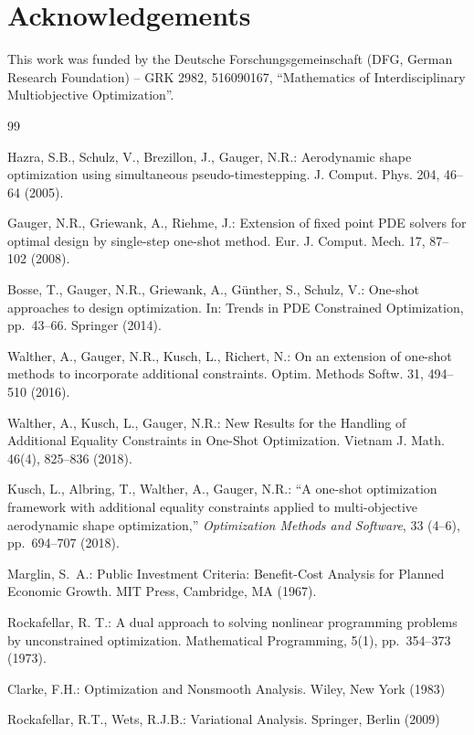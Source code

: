 \documentclass[11pt]{article}
\begin{document}

\section*{Acknowledgements}
This work was funded by the Deutsche Forschungsgemeinschaft (DFG, German Research Foundation)
– GRK 2982, 516090167, ``Mathematics of Interdisciplinary Multiobjective Optimization''.

\begin{thebibliography}{99}

Hazra, S.B., Schulz, V., Brezillon, J., Gauger, N.R.:
Aerodynamic shape optimization using simultaneous pseudo-timestepping.
J. Comput. Phys. 204, 46--64 (2005).

Gauger, N.R., Griewank, A., Riehme, J.:
Extension of fixed point PDE solvers for optimal design by single-step
one-shot method.
Eur. J. Comput. Mech. 17, 87--102 (2008).

Bosse, T., Gauger, N.R., Griewank, A., Günther, S., Schulz, V.:
One-shot approaches to design optimization.
In: Trends in PDE Constrained Optimization,
pp.~43--66. Springer (2014).

Walther, A., Gauger, N.R., Kusch, L., Richert, N.:
On an extension of one-shot methods to incorporate additional
constraints.
Optim. Methods Softw. 31, 494--510 (2016).

 Walther, A., Kusch, L., Gauger, N.R.: 
 New Results for the Handling of Additional Equality Constraints in One-Shot Optimization.
Vietnam J. Math. 46(4), 825--836 (2018).

Kusch, L., Albring, T., Walther, A., Gauger, N.R.:
``A one-shot optimization framework with additional equality constraints applied to multi-objective aerodynamic shape optimization,''
\emph{Optimization Methods and Software}, 33 (4--6), pp.~694--707 (2018).

Marglin, S.~A.: 
Public Investment Criteria: Benefit-Cost Analysis for Planned Economic Growth.
MIT Press, Cambridge, MA (1967).

Rockafellar, R. T.:
A dual approach to solving nonlinear programming problems by
unconstrained optimization.
Mathematical Programming,
5(1), pp.~354--373 (1973).

Clarke, F.H.:
Optimization and Nonsmooth Analysis.
Wiley, New York (1983)

Rockafellar, R.T., Wets, R.J.B.:
Variational Analysis.
Springer, Berlin (2009)

\end{thebibliography}
\end{document}
